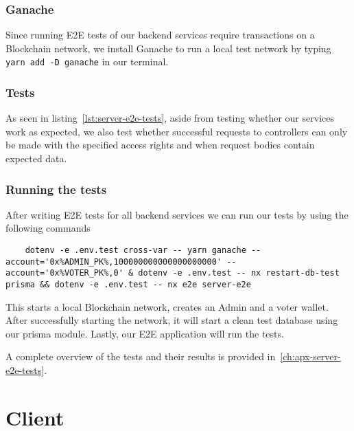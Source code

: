 \subsubsection{Ganache}

Since running \gls{E2E} tests of our backend services require transactions on a \gls{Blockchain} network, we install Ganache to run a local test network by typing \texttt{yarn add -D ganache} in our terminal.

\subsubsection{Tests}


As seen in listing~\ref{lst:server-e2e-tests}, aside from testing whether our services work as expected, we also test whether successful requests to controllers can only be made with the specified access rights and when request bodies contain expected data.

\subsubsection{Running the tests}

After writing \gls{E2E} tests for all backend services we can run our tests by using the following commands

\begin{verbatim}
    dotenv -e .env.test cross-var -- yarn ganache --account='0x%ADMIN_PK%,100000000000000000000' --account='0x%VOTER_PK%,0' & dotenv -e .env.test -- nx restart-db-test prisma && dotenv -e .env.test -- nx e2e server-e2e
\end{verbatim}

This starts a local \gls{Blockchain} network, creates an \gls{Admin} and a voter wallet.
After successfully starting the network, it will start a clean test database using our prisma module.
Lastly, our \gls{E2E} application will run the tests.

A complete overview of the tests and their results is provided in~\cref{ch:apx-server-e2e-tests}.

\section{Client}\label{sec:client}

